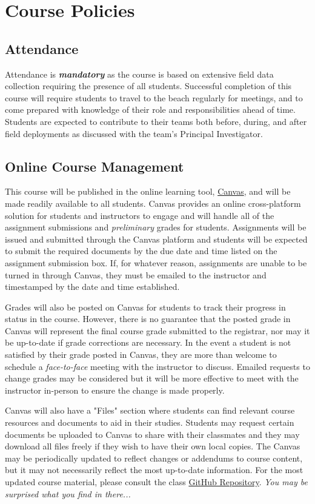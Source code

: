 \documentclass[
	letterpaper, %
	fontsize=10pt, %
	twoside=true, %
	numbers=noenddot, %
]{kaobook}
\begin{document}
\section*{Course Policies} 
\subsection*{Attendance} \label{ssec:attendance}
Attendance is \textbf{\emph{mandatory}} as the course is based on extensive field data collection requiring the presence of all students. 
Successful completion of this course will require students to travel to the beach regularly for meetings, and to come prepared with knowledge of their role and responsibilities ahead of time.
Students are expected to contribute to their teams both before, during, and after field deployments as discussed with the team's Principal Investigator.

\subsection*{Online Course Management} \label{ssec:course_mgmt}
This course will be published in the online learning tool, \href{https://fit.instructure.com/}{Canvas}, and will be made readily available to all students. 
Canvas provides an online cross-platform solution for students and instructors to engage and will handle all of the assignment submissions and \emph{preliminary} grades for students.
Assignments will be issued and submitted through the Canvas platform and students will be expected to submit the required documents by the due date and time listed on the assignment submission box.
If, for whatever reason, assignments are unable to be turned in through Canvas, they must be emailed to the instructor and timestamped by the date and time established.

Grades will also be posted on Canvas for students to track their progress in status in the course.
However, there is no guarantee that the posted grade in Canvas will represent the final course grade submitted to the registrar, nor may it be up-to-date if grade corrections are necessary.
In the event a student is not satisfied by their grade posted in Canvas, they are more than welcome to schedule a \emph{face-to-face} meeting with the instructor to discuss.
Emailed requests to change grades may be considered but it will be more effective to meet with the instructor in-person to ensure the change is made properly.

Canvas will also have a "Files" section where students can find relevant course resources and documents to aid in their studies.
Students may request certain documents be uploaded to Canvas to share with their classmates and they may download all files freely if they wish to have their own local copies.
The Canvas may be periodically updated to reflect changes or addendums to course content, but it may not necessarily reflect the most up-to-date information.
For the most updated course material, please consult the class \href{https://github.com/Legohead259/OCE2901-Materials}{GitHub Repository}. \emph{You may be surprised what you find in there...}
\end{document}
